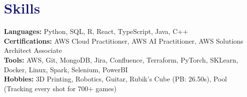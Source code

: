 \documentclass[letterpaper,11pt]{article}
\makeatletter
\newcommand{\resumeItem}[1]{
  \item\small{
    {#1 \vspace{-2pt}}
  }
}
\newcommand{\resumeProjectHeading}[2]{
    \item
    \begin{tabular*}{1.001\textwidth}{l@{\extracolsep{\fill}}r}
      \small#1 & \textbf{\small #2}\\
    \end{tabular*}\vspace{-7pt}
}
\newcommand{\resumeSubHeadingListStart}{\begin{itemize}[leftmargin=0.0in, label={}]}
\newcommand{\resumeItemListStart}{\begin{itemize}}
\newcommand{\resumeItemListEnd}{\end{itemize}\vspace{-5pt}}
\newcommand\accentColor{MidnightBlue}
\makeatother
\begin{document}

    
    
\section{\textcolor{\accentColor}{Skills}}
 \begin{itemize}[leftmargin=0.15in, label={}]
    \small{\item{
        \textbf{Languages: }{Python, SQL, R, React, TypeScript, Java, C++} \\
        \textbf{Certifications: }{AWS Cloud Practitioner, AWS AI Practitioner, AWS Solutions Architect Associate} \\
        \textbf{Tools: }{AWS, Git, MongoDB, Jira, Confluence, Terraform, PyTorch, SKLearn, Docker, Linux, Spark, Selenium, PowerBI} \\ 
        \textbf{Hobbies: }{3D Printing, Robotics, Guitar, Rubik's Cube (PB: 26.50s), Pool (Tracking every shot for 700+ games)}
    }}
 \end{itemize}
 \vspace{-10pt}
\end{document}

